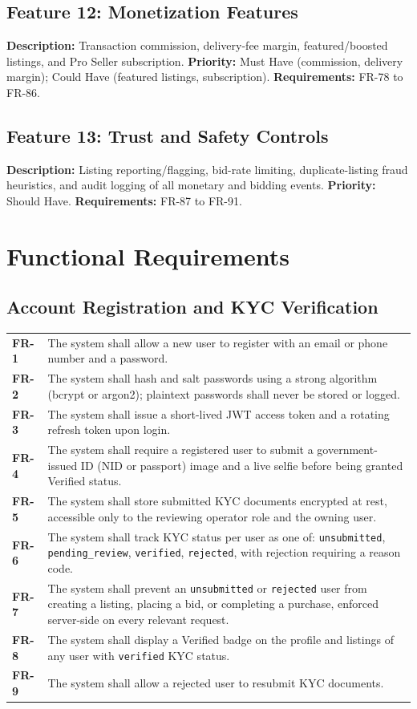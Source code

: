 \documentclass[11pt,a4paper]{report}
\newenvironment{reqtable}{\begin{longtable}{p{2.2cm}p{11.5cm}}}{\end{longtable}}
\begin{document}
\section{Feature 12: Monetization Features}
\textbf{Description:} Transaction commission, delivery-fee margin, featured/boosted listings, and Pro Seller subscription. \textbf{Priority:} Must Have (commission, delivery margin); Could Have (featured listings, subscription). \textbf{Requirements:} FR-78 to FR-86.

\section{Feature 13: Trust and Safety Controls}
\textbf{Description:} Listing reporting/flagging, bid-rate limiting, duplicate-listing fraud heuristics, and audit logging of all monetary and bidding events. \textbf{Priority:} Should Have. \textbf{Requirements:} FR-87 to FR-91.

\chapter{Functional Requirements}

\section{Account Registration and KYC Verification}
\begin{reqtable}
\textbf{FR-1} & The system shall allow a new user to register with an email or phone number and a password. \\
\textbf{FR-2} & The system shall hash and salt passwords using a strong algorithm (bcrypt or argon2); plaintext passwords shall never be stored or logged. \\
\textbf{FR-3} & The system shall issue a short-lived JWT access token and a rotating refresh token upon login. \\
\textbf{FR-4} & The system shall require a registered user to submit a government-issued ID (NID or passport) image and a live selfie before being granted Verified status. \\
\textbf{FR-5} & The system shall store submitted KYC documents encrypted at rest, accessible only to the reviewing operator role and the owning user. \\
\textbf{FR-6} & The system shall track KYC status per user as one of: \texttt{unsubmitted}, \texttt{pending\_review}, \texttt{verified}, \texttt{rejected}, with rejection requiring a reason code. \\
\textbf{FR-7} & The system shall prevent an \texttt{unsubmitted} or \texttt{rejected} user from creating a listing, placing a bid, or completing a purchase, enforced server-side on every relevant request. \\
\textbf{FR-8} & The system shall display a Verified badge on the profile and listings of any user with \texttt{verified} KYC status. \\
\textbf{FR-9} & The system shall allow a rejected user to resubmit KYC documents. \\
\end{reqtable}
\end{document}
